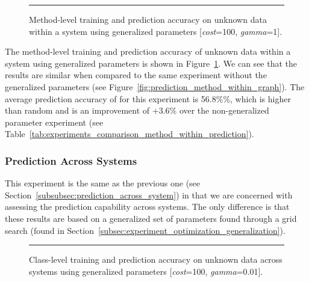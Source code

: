 \begin{figure}[!tb]
  \centering
  \begin{adjustbox}{max size={\textwidth}{\textheight}}
    
  \end{adjustbox}
  \caption{Method-level training and prediction accuracy on unknown data within a system using generalized parameters [\emph{cost}=100, \emph{gamma}=1].}
  \vspace{2mm}
  \hrule
  \label{fig:prediction_with_parameters_method_within_graph}
\end{figure}

The method-level training and prediction accuracy of unknown data within a system using generalized parameters is shown in Figure~\ref{fig:prediction_with_parameters_method_within_graph}. We can see that the results are similar when compared to the same experiment without the generalized parameters (see Figure~\ref{fig:prediction_method_within_graph}). The average prediction accuracy of for this experiment is 56.8\%\%, which is higher than random and is an improvement of +3.6\% over the non-generalized parameter experiment (see Table~\ref{tab:experiments_comparison_method_within_prediction}).

\subsubsection{Prediction Across Systems}
\label{subsubsec:prediction_with_parameters_across_systems}
This experiment is the same as the previous one (see Section~\ref{subsubsec:prediction_across_system}) in that we are concerned with assessing the prediction capability across systems. The only difference is that these results are based on a generalized set of parameters found through a grid search (found in Section~\ref{subsec:experiment_optimization_generalization}).

\begin{figure}[!tb]
  \centering
  \begin{adjustbox}{max size={\textwidth}{\textheight}}
    
  \end{adjustbox}
  \caption{Class-level training and prediction accuracy on unknown data across systems using generalized parameters [\emph{cost}=100, \emph{gamma}=0.01].}
  \vspace{2mm}
  \hrule
  \label{fig:prediction_with_parameters_class_across_graph}
\end{figure}

